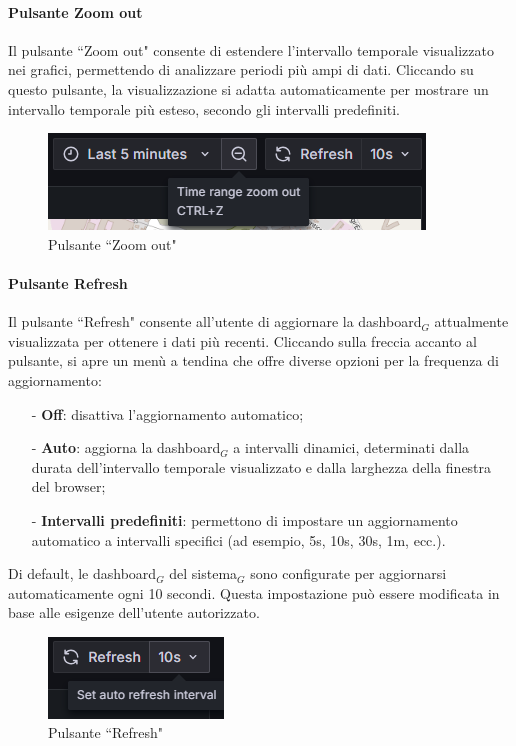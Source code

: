 \documentclass[10pt]{article}
\begin{document}
\begin{justify}
    \paragraph{Pulsante Zoom out}
    Il pulsante ``Zoom out" consente di estendere l'intervallo temporale visualizzato nei grafici, permettendo di analizzare periodi più ampi di dati. Cliccando su questo pulsante, la visualizzazione si adatta automaticamente per mostrare un intervallo temporale più esteso, secondo gli intervalli predefiniti.
    \begin{figure}[H]
    \centering
    \includegraphics[width=0.45\linewidth]{zoomout.png}
    \caption{Pulsante ``Zoom out"}
    \end{figure}
    
    \paragraph{Pulsante Refresh}
    Il pulsante ``Refresh" consente all'utente di aggiornare la dashboard$_G$ attualmente visualizzata per ottenere i dati più recenti. Cliccando sulla freccia accanto al pulsante, si apre un menù a tendina che offre diverse opzioni per la frequenza di aggiornamento:
    \begin{itemize}
        \item[-] \textbf{Off}: disattiva l'aggiornamento automatico;
        \item[-] \textbf{Auto}: aggiorna la dashboard$_G$ a intervalli dinamici, determinati dalla durata dell'intervallo temporale visualizzato e dalla larghezza della finestra del browser;
        \item[-] \textbf{Intervalli predefiniti}: permettono di impostare un aggiornamento automatico a intervalli specifici (ad esempio, 5s, 10s, 30s, 1m, ecc.).
    \end{itemize}
    Di default, le dashboard$_G$ del sistema$_G$ sono configurate per aggiornarsi automaticamente ogni 10 secondi. Questa impostazione può essere modificata in base alle esigenze dell'utente autorizzato.
    \begin{figure}[H]
    \centering
    \includegraphics[width=0.25\linewidth]{refresh.png}
    \caption{Pulsante ``Refresh"}
    \end{figure}



\end{justify}
\end{document}
